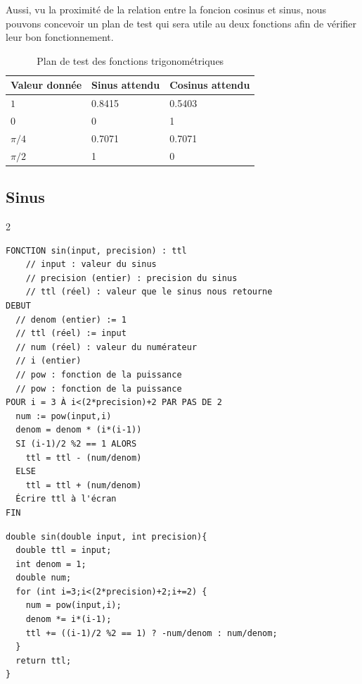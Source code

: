 \documentclass[a11paper, 11pt]{article}
\begin{document}
Aussi, vu la proximité de la relation entre la foncion cosinus et sinus, nous
pouvons concevoir un plan de test qui sera utile au deux fonctions afin de
vérifier leur bon fonctionnement.

\begin{table}[H]
  \centering
  \caption{Plan de test des fonctions trigonométriques}
  \label{tab:trig-tests}
  \begin{tabular}{lll}
    \toprule
    Valeur donnée  & Sinus attendu & Cosinus attendu \\
    \midrule
    $1$            & \num{0.8415}  & \num{0.5403}    \\
    $0$            & \num{0}       & \num{1}         \\
    $\pi/4$        & \num{0.7071}  & \num{0.7071}    \\
    $\pi/2$        & \num{1}       & \num{0}         \\
    \bottomrule
  \end{tabular}

\end{table}

\newpage
\subsection{Sinus}

\begin{multicols}{2}

\begin{lstlisting}[caption=Pseudocode de la fonction sinus]
FONCTION sin(input, precision) : ttl
	// input : valeur du sinus
	// precision (entier) : precision du sinus
	// ttl (réel) : valeur que le sinus nous retourne
DEBUT
  // denom (entier) := 1
  // ttl (réel) := input
  // num (réel) : valeur du numérateur
  // i (entier)
  // pow : fonction de la puissance
  // pow : fonction de la puissance
POUR i = 3 À i<(2*precision)+2 PAR PAS DE 2
  num := pow(input,i)
  denom = denom * (i*(i-1))
  SI (i-1)/2 %2 == 1 ALORS
    ttl = ttl - (num/denom)
  ELSE
    ttl = ttl + (num/denom)
  Écrire ttl à l'écran
FIN
\end{lstlisting}

\columnbreak

\begin{lstlisting}[caption=Fonction sinus écrite en C]
double sin(double input, int precision){
  double ttl = input;
  int denom = 1;
  double num;
  for (int i=3;i<(2*precision)+2;i+=2) {
    num = pow(input,i);
    denom *= i*(i-1);
    ttl += ((i-1)/2 %2 == 1) ? -num/denom : num/denom;
  }
  return ttl;
}
\end{lstlisting}

\end{multicols}
\end{document}

